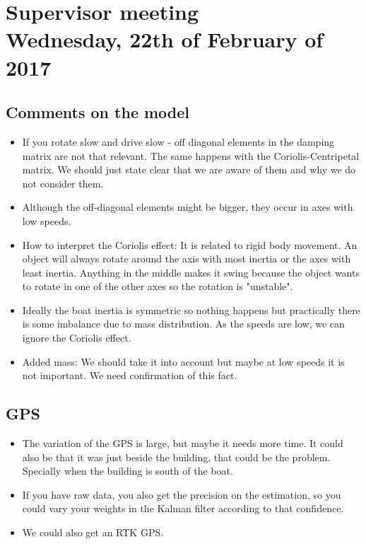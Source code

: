 
\renewcommand{\vec}[1]{\boldsymbol{\mathbf{#1}}}

\renewcommand\chaptername{KAPITEL}
\renewcommand\contentsname{Indhold}
\renewcommand\figurename{Figur}
\renewcommand\tablename{Tabel}

\section*{Supervisor meeting\\ \small Wednesday, 22th of February of 2017}
\subsection{Comments on the model}
\begin{itemize}
	\item If you rotate slow and drive slow - off diagonal elements in the damping matrix are not that relevant. The same happens with the Coriolis-Centripetal matrix. We should just state clear that we are aware of them and why we do not consider them. 
	\item Although the off-diagonal elements might be bigger, they occur in axes with low speeds.
	\item How to interpret the Coriolis effect: It is related to rigid body movement. An object will always rotate around the axis with most inertia or the axes with least inertia. Anything in the middle makes it swing because the object wants to rotate in one of the other axes so the rotation is "unstable". 
	\item Ideally the boat inertia is symmetric so nothing happens but practically there is some imbalance due to mass distribution. As the speeds are low, we can ignore the Coriolis effect.
	\item Added mass: We should take it into account but maybe at low speeds it is not important. We need confirmation of this fact.
\end{itemize}	
\subsection{GPS}
\begin{itemize}
	\item The variation of the GPS is large, but maybe it needs more time. It could also be that it was just beside the building, that could be the problem. Specially when the building is south of the boat.
	\item If you have raw data, you also get the precision on the estimation, so you could vary your weights in the Kalman filter according to that confidence.
	\item We could also get an RTK GPS.
\end{itemize}

